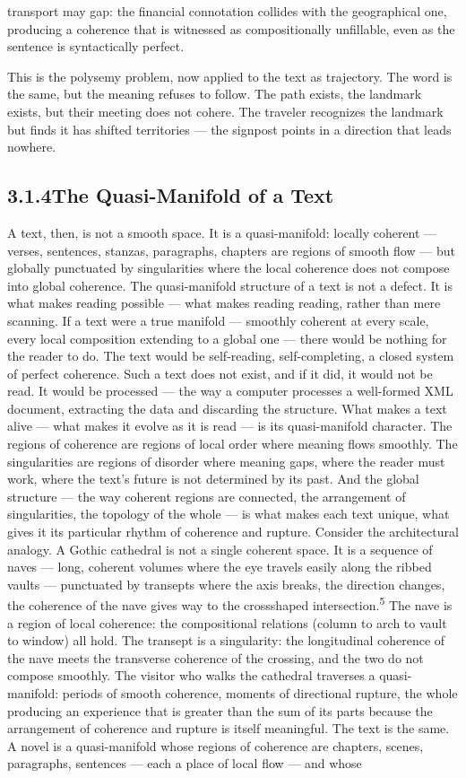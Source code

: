 transport may gap: the financial connotation collides with the geographical one, producing a coherence that is witnessed as compositionally unfillable, even as the sentence is syntactically perfect.

This is the polysemy problem, now applied to the text as trajectory. The word is the same, but the meaning refuses to follow. The path exists, the landmark exists, but their meeting does not cohere. The traveler recognizes the landmark but finds it has shifted territories — the signpost points in a direction that leads nowhere.

\subsection{3.1.4\quad The Quasi-Manifold of a Text}

A text, then, is not a smooth space. It is a quasi-manifold: locally coherent — verses, sentences, stanzas, paragraphs, chapters are regions of smooth flow — but globally punctuated by singularities where the local coherence does not compose into global coherence. The quasi-manifold structure of a text is not a defect. It is what makes reading possible — what makes reading reading, rather than mere scanning. If a text were a true manifold — smoothly coherent at every scale, every local composition extending to a global one — there would be nothing for the reader to do. The text would be self-reading, self-completing, a closed system of perfect coherence. Such a text does not exist, and if it did, it would not be read. It would be processed — the way a computer processes a well-formed XML document, extracting the data and discarding the structure. What makes a text alive — what makes it evolve as it is read — is its quasi-manifold character. The regions of coherence are regions of local order where meaning flows smoothly. The singularities are regions of disorder where meaning gaps, where the reader must work, where the text’s future is not determined by its past. And the global structure — the way coherent regions are connected, the arrangement of singularities, the topology of the whole — is what makes each text unique, what gives it its particular rhythm of coherence and rupture. Consider the architectural analogy. A Gothic cathedral is not a single coherent space. It is a sequence of naves — long, coherent volumes where the eye travels easily along the ribbed vaults — punctuated by transepts where the axis breaks, the direction changes, the coherence of the nave gives way to the crossshaped intersection.\textsuperscript{5} The nave is a region of local coherence: the compositional relations (column to arch to vault to window) all hold. The transept is a singularity: the longitudinal coherence of the nave meets the transverse coherence of the crossing, and the two do not compose smoothly. The visitor who walks the cathedral traverses a quasi-manifold: periods of smooth coherence, moments of directional rupture, the whole producing an experience that is greater than the sum of its parts because the arrangement of coherence and rupture is itself meaningful. The text is the same. A novel is a quasi-manifold whose regions of coherence are chapters, scenes, paragraphs, sentences — each a place of local flow — and whose 